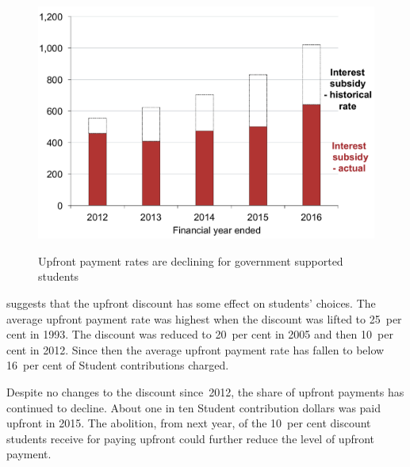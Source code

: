 \documentclass[embargoed]{grattan}
\begin{document}
\begin{figure}
\caption{Upfront payment rates are declining for government supported students}\label{fig:fig6-upfront-payment-rates-are-declining-for-govt-supported-students}

\includegraphics[page=6]{atlas/Chartpack.pdf}

{\textcites{EducationvariousyearsHighereducationreport}{Education2016StudentsSelectedhigher}}
\end{figure}

 suggests that the upfront discount has some effect on students' choices.
The average upfront payment rate was highest when the discount was lifted to 25~per cent in 1993.
The discount was reduced to 20~per cent in 2005 and then 10~per cent in 2012.
Since then the average upfront payment rate has fallen to below 16~per cent of \gls{Student contribution}s charged.

Despite no changes to the discount since~2012, the share of upfront payments has continued to decline.
About one in ten \gls{Student contribution} dollars was paid upfront in 2015.
The abolition, from next year, of the 10~per cent discount students receive for paying upfront could further reduce the level of upfront payment.
\end{document}
